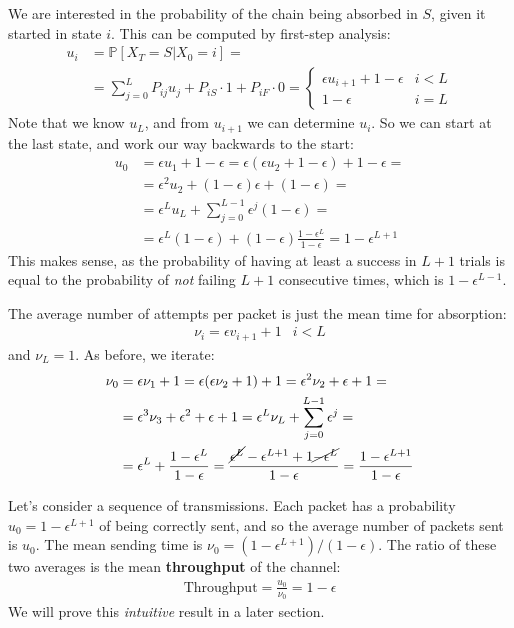 \documentclass[../template.tex]{subfiles}
\begin{document}
We are interested in the probability of the chain being absorbed in $S$, given it started in state $i$. This can be computed by first-step analysis:
\begin{align*}
    u_i &= \mathbb{P}[X_T = S|X_0 = i] =\\
    &= \sum_{j=0}^L P_{ij} u_j + P_{iS} \cdot 1 + P_{iF} \cdot 0 = \begin{cases}
        \epsilon u_{i+1} + 1 - \epsilon & i<L\\
        1- \epsilon & i = L
    \end{cases}
\end{align*}
Note that we know $u_L$, and from $u_{i+1}$ we can determine $u_i$. So we can start at the last state, and work our way backwards to the start:
\begin{align*}
    u_0 &= \epsilon u_1 + 1-\epsilon = \epsilon(\epsilon u_2 + 1-\epsilon) + 1 -\epsilon=\\
    &= \epsilon^2 u_2 + (1-\epsilon) \epsilon + (1-\epsilon) = \\
    &= \epsilon^L u_L + \sum_{j=0}^{L-1} \epsilon^j(1-\epsilon)=\\
    &= \epsilon^L (1-\epsilon) + (1-\epsilon) \frac{1-\epsilon^L}{1- \epsilon} = 1 - \epsilon^{L+1} 
\end{align*}
This makes sense, as the probability of having at least a success in $L+1$ trials is equal to the probability of \textit{not} failing $L+1$ consecutive times, which is $1-\epsilon^{L-1}$.

\medskip

The average number of attempts per packet is just the mean time for absorption:
\begin{align*}
    \nu_i = \epsilon v_{i+1} + 1 & i < L
\end{align*}
and $\nu_L = 1$. As before, we iterate:
\begin{align*}
    \nu_0 &= \epsilon \nu_1 + 1 = \epsilon(\epsilon \nu_2 + 1) + 1 = \epsilon^2 \nu_2 + \epsilon + 1=\\
    &= \epsilon^3 \nu_3 + \epsilon^2 + \epsilon + 1 = \epsilon^L \nu_L + \sum_{j=0}^{L-1} \epsilon^j = \\
    &= \epsilon^L + \frac{1-\epsilon^L}{1- \epsilon} = \frac{\cancel{\epsilon^L }- \epsilon^{L+1} + 1 \cancel{- \epsilon^L}}{1-\epsilon} = \frac{1-\epsilon^{L+1}}{1-\epsilon}   
\end{align*}

Let's consider a sequence of transmissions. Each packet has a probability $u_0 = 1- \epsilon^{L+1}$ of being correctly sent, and so the average number of packets sent is $u_0$.
The mean sending time is $\nu_0 = (1-\epsilon^{L+1})/(1-\epsilon)$. The ratio of these two averages is the mean \textbf{throughput} of the channel:
\begin{align*}
    \text{Throughput} = \frac{u_0}{\nu_0} = 1-\epsilon 
\end{align*} 
We will prove this \textit{intuitive} result in a later section.  
\end{document}
